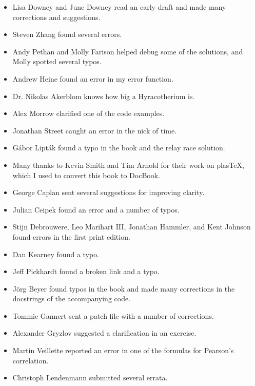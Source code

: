 \documentclass[12pt]{book}
\begin{document}
\begin{itemize}

\item Lisa Downey and June Downey read an early draft and made many
corrections and suggestions.

\item Steven Zhang found several errors.

\item Andy Pethan and Molly Farison helped debug some of the solutions,
and Molly spotted several typos.

\item Andrew Heine found an error in my error function.

\item Dr. Nikolas Akerblom knows how big a Hyracotherium is.

\item Alex Morrow clarified one of the code examples.

\item Jonathan Street caught an error in the nick of time.

\item G\'{a}bor Lipt\'{a}k found a typo in the book and the relay race solution.

\item Many thanks to Kevin Smith and Tim Arnold for their work on
plasTeX, which I used to convert this book to DocBook.

\item George Caplan sent several suggestions for improving clarity.

\item Julian Ceipek found an error and a number of typos.

\item Stijn Debrouwere, Leo Marihart III, Jonathan Hammler, and Kent Johnson
found errors in the first print edition.

\item Dan Kearney found a typo.

\item Jeff Pickhardt found a broken link and a typo.

\item J\"{o}rg Beyer found typos in the book and made many corrections
in the docstrings of the accompanying code.

\item Tommie Gannert sent a patch file with a number of corrections.

\item Alexander Gryzlov suggested a clarification in an exercise.

\item Martin Veillette reported an error in one of the formulas for
Pearson's correlation.

\item Christoph Lendenmann submitted several errata.


\end{itemize}
\end{document}
